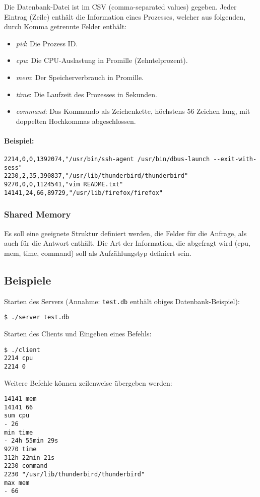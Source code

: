 Die Datenbank-Datei ist im CSV (comma-separated values) gegeben.
Jeder Eintrag (Zeile) enthält die Information eines Prozesses, welcher
aus folgenden, durch Komma getrennte Felder enthält:

\begin{itemize}
  \item \emph{pid}: Die Prozess ID.
  \item \emph{cpu}: Die CPU-Auslastung in Promille (Zehntelprozent).
  \item \emph{mem}: Der Speicherverbrauch in Promille.
  \item \emph{time}: Die Laufzeit des Prozesses in Sekunden.
  \item \emph{command}: Das Kommando als Zeichenkette, höchstens 56
    Zeichen lang, mit doppelten Hochkommas abgeschlossen.
\end{itemize}

\paragraph{Beispiel:}

\begin{verbatim}
2214,0,0,1392074,"/usr/bin/ssh-agent /usr/bin/dbus-launch --exit-with-sess"
2230,2,35,390837,"/usr/lib/thunderbird/thunderbird"
9270,0,0,1124541,"vim README.txt"
14141,24,66,89729,"/usr/lib/firefox/firefox"
\end{verbatim}



\subsubsection*{Shared Memory}

Es soll eine geeignete Struktur definiert werden, die Felder für die Anfrage,
als auch für die Antwort enthält. Die Art der Information, die abgefragt wird
(cpu, mem, time, command) soll als Aufzählungstyp definiert sein.


\subsection*{Beispiele}

Starten des Servers (Annahme: \texttt{test.db} enthält obiges
Datenbank-Beispiel):
%
\begin{verbatim}
$ ./server test.db
\end{verbatim}
%
Starten des Clients und Eingeben eines Befehls:
%
\begin{verbatim}
$ ./client
2214 cpu
2214 0
\end{verbatim}
%
Weitere Befehle können zeilenweise übergeben werden:
%
\begin{verbatim}
14141 mem
14141 66
sum cpu
- 26
min time
- 24h 55min 29s
9270 time
312h 22min 21s
2230 command
2230 "/usr/lib/thunderbird/thunderbird"
max mem
- 66
\end{verbatim}

\osueguidelinesthree


